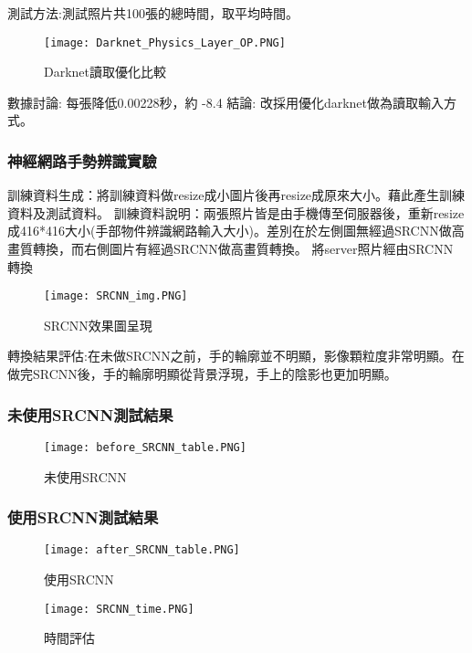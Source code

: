 測試方法:測試照片共100張的總時間，取平均時間。
\begin{figure}[H]
    \centering
    \texttt{[image: Darknet\_Physics\_Layer\_OP.PNG]}
    \caption{Darknet讀取優化比較}
    \label{fig:Darknet讀取優化比較}
\end{figure}
數據討論: 
每張降低0.00228秒，約 -8.4%
結論: 
改採用優化darknet做為讀取輸入方式。


\subsubsection{神經網路手勢辨識實驗}

訓練資料生成：將訓練資料做resize成小圖片後再resize成原來大小。藉此產生訓練資料及測試資料。
訓練資料說明：兩張照片皆是由手機傳至伺服器後，重新resize成416*416大小(手部物件辨識網路輸入大小)。差別在於左側圖無經過SRCNN做高畫質轉換，而右側圖片有經過SRCNN做高畫質轉換。
將server照片經由SRCNN 轉換

\begin{figure}[H]
    \centering
    \texttt{[image: SRCNN\_img.PNG]}
    \caption{SRCNN效果圖呈現}
    \label{fig:SRCNN效果圖呈現}
\end{figure}

轉換結果評估:在未做SRCNN之前，手的輪廓並不明顯，影像顆粒度非常明顯。在做完SRCNN後，手的輪廓明顯從背景浮現，手上的陰影也更加明顯。

\subsubsection{未使用SRCNN測試結果}

\begin{figure}[H]
    \centering
    \texttt{[image: before\_SRCNN\_table.PNG]}
    \caption{未使用SRCNN}
    \label{fig:未使用SRCNN}
\end{figure}

\subsubsection{使用SRCNN測試結果}

\begin{figure}[H]
    \centering
    \texttt{[image: after\_SRCNN\_table.PNG]}
    \caption{使用SRCNN}
    \label{fig:使用SRCNN}
\end{figure}

\begin{figure}[H]
    \centering
    \texttt{[image: SRCNN\_time.PNG]}
    \caption{時間評估}
    \label{時間評估}
\end{figure}


